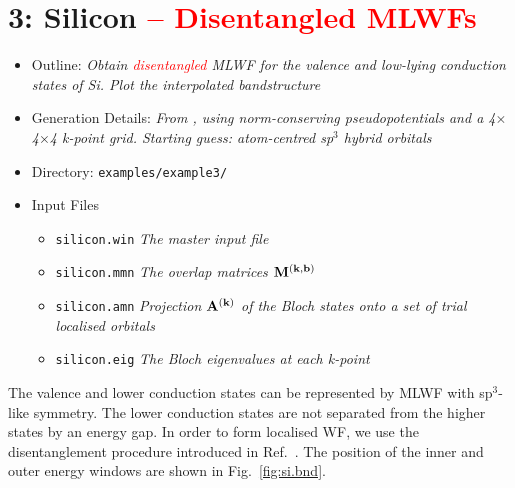 \documentclass[a4paper,11pt,twoside]{article}
\def\tent#1{\textcolor{red}{#1}}     %
\begin{document}
\cleardoublepage


\section*{3: Silicon \tent{-- Disentangled MLWFs}}

\begin{itemize}
\item{Outline: \it{Obtain \tent{disentangled} MLWF for the valence and low-lying
    conduction states of Si. Plot the interpolated bandstructure}} 
\item{Generation Details: \it{From \pwscf, using norm-conserving
    pseudopotentials and a 4$\times$4$\times$4 k-point grid. Starting
    guess: atom-centred sp$^3$ hybrid orbitals}} 
\item{Directory: {\tt examples/example3/}}
\item{Input Files}
\begin{itemize}
\item{ {\tt silicon.win}  {\it The master input file}}
\item{ {\tt silicon.mmn}  {\it The overlap matrices $\mathbf{M}^{(\mathbf{k},\mathbf{b})}$}}
\item{ {\tt silicon.amn}  {\it Projection $\mathbf{A}^{(\mathbf{k})}$ of the Bloch states onto a
    set of trial localised orbitals}} 
\item{ {\tt silicon.eig}  {\it The Bloch eigenvalues at each k-point}}
\end{itemize}
\end{itemize}
The valence and lower conduction states can be represented by MLWF
with sp$^3$-like symmetry. The lower conduction states are not 
separated from the higher states by an energy gap. In order to form
localised WF, we use the disentanglement procedure
introduced in Ref.~\cite{SMV}. The position of the inner and outer
energy windows are shown in Fig.~\ref{fig:si.bnd}. 
\end{document}
